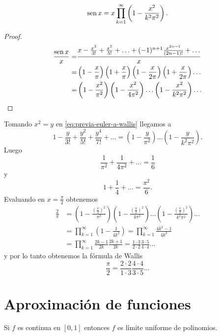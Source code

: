\begin{teorema}[Euler(1748)]{}
\[\operatorname{sen} x=
x \prod\limits_{k=1}^{\infty}
\left(1-\frac{x^2}{k^2 \pi^2}\right).
\]
\end{teorema}

\begin{proof}
\begin{equation}\label{eq:previa-euler-a-wallis}
\begin{split}
\frac{\operatorname{sen} x}{x}=&\frac{x-\frac{x^3}{3!}+\frac{x^5}{5!}+\ldots+(-1)^{n+1}\frac{x^{2n-1}}{(2n-1)!}+\ldots}{x}
\\
=&\left(1-\frac{x}{\pi}\right)\left(1+\frac{x}{\pi}\right)\left(1-\frac{x}{2\pi}\right)\left(1+\frac{x}{2\pi}\right)\ldots
\\
=& \left(1-\frac{x^2}{\pi^2}\right) \left(1-\frac{x^2}{4\pi^2}\right)\ldots \left(1-\frac{x^2}{k^2 \pi^2}\right)\ldots
\end{split}
\end{equation}
\end{proof}
Tomando $x^2=y$  en \eqref{eq:previa-euler-a-wallis} llegamos a 
\[1-\frac{y}{3!}+\frac{y^2}{5!}+\frac{y^4}{7!}+\ldots=\left(1-\frac{y}{\pi^2}\right)\ldots\left(1-\frac{y}{k^2\pi^2}\right).
\]
Luego
\[
\frac{1}{\pi^2}+\frac{1}{4\pi^2}+\ldots=\frac{1}{6}
\]
y 
\[
1+\frac{1}{4}+\ldots=\frac{\pi^2}{6}.
\]
Evaluando en $x=\frac{\pi}{2}$ obtenemos
\[
\begin{split}
\frac{2}{\pi}&=
\left(1-\frac{(\frac{\pi}{2})^2}{\pi^2}\right) \left(1-\frac{(\frac{\pi}{2})^2}{4\pi^2}\right)\ldots
\left(1-\frac{(\frac{\pi}{2})^2}{k^2\pi^2}\right)\ldots
\\
&=\prod\limits_{k=1}^{\infty} \left(1-\frac{1}{4k^2}\right)=\prod\limits_{k=1}^{\infty}\frac{4k^2-1}{4k^2}
\\
&=\prod\limits_{k=1}^{\infty} \frac{2k-1}{2k}\frac{2k+1}{2k}=\frac{1\cdot3}{2\cdot 2}\frac{3 \cdot 5}{4 \cdot 4}\ldots
\end{split}
\]
y por lo tanto obtenemos la fórmula de Wallis
\[
\frac{\pi}{2}=\frac{2\cdot 2}{1 \cdot 3}\frac{4 \cdot 4}{3\cdot 5}\ldots
\]

\section{Aproximación de funciones}

\begin{teorema}[Weierstrass]{}
Si $f$ es continua en $[0,1]$ entonces $f$ es límite uniforme de polinomios.
\end{teorema}

